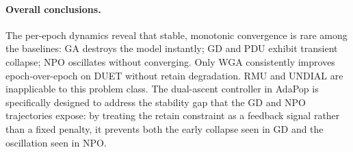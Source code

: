 \paragraph{Overall conclusions.}
The per-epoch dynamics reveal that stable, monotonic convergence is rare among the baselines: GA destroys the model instantly; GD and PDU exhibit transient collapse; NPO oscillates without converging. Only WGA consistently improves epoch-over-epoch on DUET without retain degradation. RMU and UNDIAL are inapplicable to this problem class. The dual-ascent controller in AdaPop is specifically designed to address the stability gap that the GD and NPO trajectories expose: by treating the retain constraint as a feedback signal rather than a fixed penalty, it prevents both the early collapse seen in GD and the oscillation seen in NPO.
